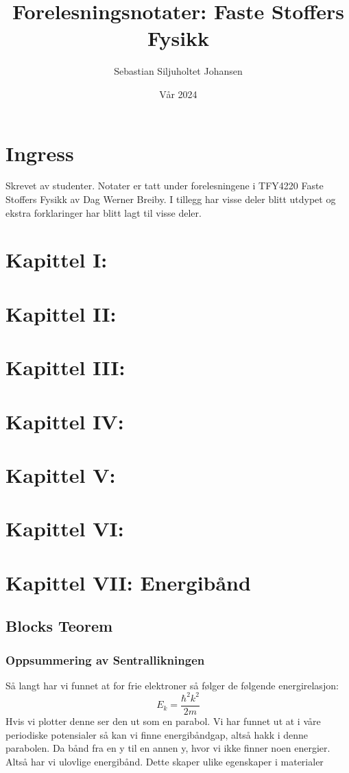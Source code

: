 \documentclass{article}
\title{Forelesningsnotater: Faste Stoffers Fysikk}
\author{Sebastian Siljuholtet Johansen }
\date{Vår 2024}
\begin{document}
\maketitle

\newpage
\section*{Ingress}
Skrevet av studenter. Notater er tatt under forelesningene i TFY4220 Faste Stoffers Fysikk av Dag Werner Breiby. I tillegg har visse deler blitt utdypet og ekstra forklaringer har blitt lagt til visse deler.
\newpage
\tableofcontents

\newpage
\section{Kapittel I: }
\newpage
\section{Kapittel II: }
\newpage
\section{Kapittel III: }
\newpage
\section{Kapittel IV: }
\newpage
\section{Kapittel V: }
\newpage
\section{Kapittel VI: }
\newpage
\section{Kapittel VII: Energibånd }
\subsection{Blocks Teorem}
\subsubsection{Oppsummering av Sentrallikningen}
Så langt har vi funnet at for frie elektroner så følger de følgende energirelasjon:
\begin{equation}
  \label{eq:energi_for_frie_elektroner}
  E_k = \frac{\hbar^2 k^2}{2m}
\end{equation}
Hvis vi plotter denne ser den ut som en parabol. Vi har funnet ut at i våre periodiske potensialer så kan vi finne energibåndgap, altså hakk i denne parabolen. Da bånd fra en y til en annen y, hvor vi ikke finner noen energier. Altså har vi ulovlige energibånd. Dette skaper ulike egenskaper i materialer %
\end{document}
